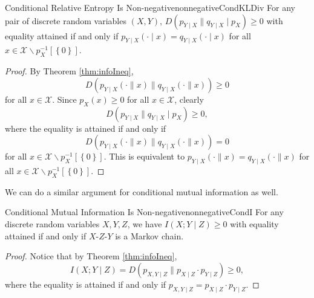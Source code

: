 \documentclass[math, code]{amznotes}
\theoremstyle{remark}
\begin{document}
\begin{corbox}{Conditional Relative Entropy Is Non-negative}{nonnegativeCondKLDiv}
    For any pair of discrete random variables $\left(X, Y\right)$, $D\left(p_{Y \mid X} \parallel q_{Y \mid X} \mid p_X\right) \geq 0$ with equality attained if and only if $p_{Y \mid X}\left(\cdot \mid x\right) = q_{Y \mid X}\left(\cdot \mid x\right)$ for all $x \in \mathcal{X} \backslash p_X^{-1}\left[\left\{0\right\}\right]$. 
    \tcblower
    \begin{proof}
        By Theorem \ref{thm:infoIneq}, 
        \begin{equation*}
            D\left(p_{Y \mid X}\left(\cdot \parallel x\right) \parallel q_{Y \mid X}\left(\cdot \parallel x\right)\right) \geq 0
        \end{equation*}
        for all $x \in \mathcal{X}$. Since $p_X\left(x\right) \geq 0$ for all $x \in \mathcal{X}$, clearly 
        \begin{equation*}
            D\left(p_{Y \mid X} \parallel q_{Y \mid X} \mid p_X\right) \geq 0,
        \end{equation*}
        where the equality is attained if and only if 
        \begin{equation*}
            D\left(p_{Y \mid X}\left(\cdot \parallel x\right) \parallel q_{Y \mid X}\left(\cdot \parallel x\right)\right) = 0
        \end{equation*}
        for all $x \in \mathcal{X} \backslash p_X^{-1}\left[\left\{0\right\}\right]$. This is equivalent to $p_{Y \mid X}\left(\cdot \parallel x\right) = q_{Y \mid X}\left(\cdot \parallel x\right)$ for all $x \in \mathcal{X} \backslash p_X^{-1}\left[\left\{0\right\}\right]$.
    \end{proof}
\end{corbox}
We can do a similar argument for conditional mutual information as well.
\begin{corbox}{Conditional Mutual Information Is Non-negative}{nonnegativeCondI}
    For any discrete random variables $X, Y, Z$, we have $I\left(X ; Y \mid Z\right) \geq 0$ with equality attained if and only if $X$-$Z$-$Y$ is a Markov chain.
    \tcblower
    \begin{proof}
        Notice that by Theorem \ref{thm:infoIneq},
        \begin{equation*}
            I\left(X ; Y \mid Z\right) = D\left(p_{X, Y \mid Z} \parallel p_{X \mid Z} \cdot p_{Y \mid Z}\right) \geq 0,
        \end{equation*}
        where the equality is attained if and only if $p_{X, Y \mid Z} = p_{X \mid Z} \cdot p_{Y \mid Z}$. 
    \end{proof}
\end{corbox}
\end{document}
